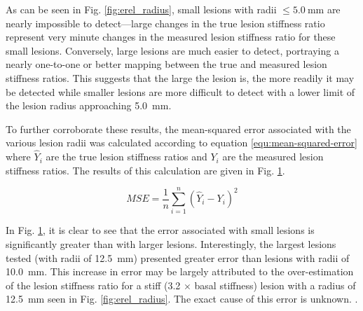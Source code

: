 			As can be seen in Fig. \ref{fig:erel_radius}, small lesions with radii $\leq \SI{5.0}{\mm}$ are nearly impossible to detect---large changes in the true lesion stiffness ratio represent very minute changes in the measured lesion stiffness ratio for these small lesions. Conversely, large lesions are much easier to detect, portraying a nearly one-to-one or better mapping between the true and measured lesion stiffness ratios. This suggests that the large the lesion is, the more readily it may be detected while smaller lesions are more difficult to detect with a lower limit of the lesion radius approaching \SI{5.0}{\mm}.

			\begin{figure}[!htb]
				\centering
				\caption[]{}
				\label{fig:erel_radius_mse}
			\end{figure}

			To further corroborate these results, the mean-squared error associated with the various lesion radii was calculated according to equation \ref{equ:mean-squared-error} where $\hat{Y}_i$ are the true lesion stiffness ratios and $Y_i$ are the measured lesion stiffness ratios. The results of this calculation are given in Fig. \ref{fig:erel_radius_mse}.

			\begin{equation}
				\label{equ:mean-squared-error}
				MSE = \frac{1}{n}\sum_{i=1}^n \left(\hat{Y}_i - Y_i\right)^2
			\end{equation}

			In Fig. \ref{fig:erel_radius_mse}, it is clear to see that the error associated with small lesions is significantly greater than with larger lesions. Interestingly, the largest lesions tested (with radii of \SI{12.5}{\mm}) presented greater error than lesions with radii of \SI{10.0}{\mm}. This increase in error may be largely attributed to the over-estimation of the lesion stiffness ratio for a stiff (3.2 $\times$ basal stiffness) lesion with a radius of \SI{12.5}{\mm} seen in Fig. \ref{fig:erel_radius}. The exact cause of this error is unknown. .

